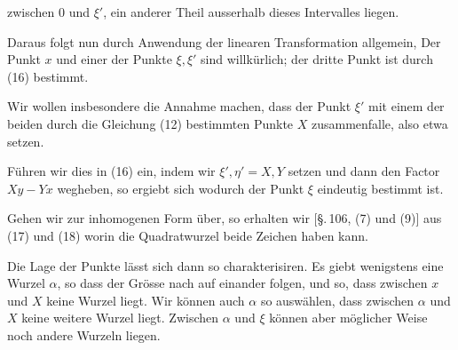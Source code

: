 zwischen $0$ und $\xi'$, ein anderer Theil ausserhalb dieses Intervalles liegen.

Daraus folgt nun durch Anwendung der linearen Transformation allgemein,  Der Punkt $x$ und einer der Punkte $\xi, \xi'$ sind willkürlich; der dritte Punkt ist durch (16) bestimmt.

Wir wollen insbesondere die Annahme machen, dass der Punkt $\xi'$ mit einem der beiden durch die Gleichung (12) bestimmten Punkte $X$ zusammenfalle, also etwa
setzen.

Führen wir dies in (16) ein, indem wir $\xi', \eta' = X, Y$ setzen und dann den Factor $Xy - Yx$ wegheben, so ergiebt sich
wodurch der Punkt $\xi$ eindeutig bestimmt ist.

Gehen wir zur inhomogenen Form über, so erhalten wir [\S.\,106, (7) und (9)] aus (17) und (18)
worin die Quadratwurzel beide Zeichen haben kann.

Die Lage der Punkte lässt sich dann so charakterisiren. Es giebt wenigstens eine Wurzel $\alpha$, so dass
der Grösse nach auf einander folgen, und so, dass zwischen $x$ und $X$ keine Wurzel liegt. Wir können auch $\alpha$ so auswählen, dass zwischen $\alpha$ und $X$ keine weitere Wurzel liegt. Zwischen $\alpha$ und $\xi$ können aber möglicher Weise noch andere Wurzeln liegen.
